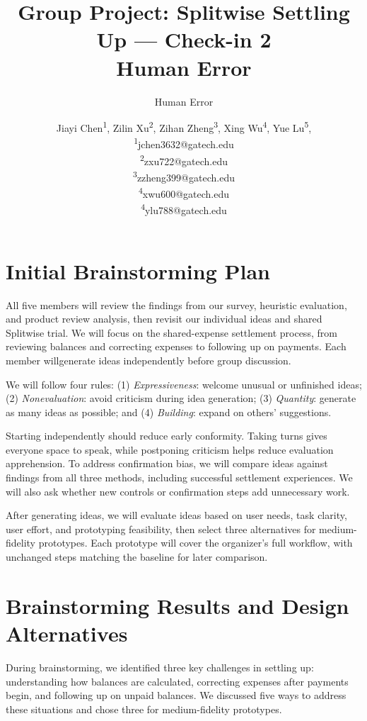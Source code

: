 \documentclass[letterpaper]{jdf}
\author{Human Error}
\title{Group Project: Splitwise Settling Up --- Check-in 2\\Human Error}
\author{
Jiayi Chen\textsuperscript{1},
Zilin Xu\textsuperscript{2},
Zihan Zheng\textsuperscript{3},
Xing Wu\textsuperscript{4},
Yue Lu\textsuperscript{5},
\\
\small
\textsuperscript{1}jchen3632@gatech.edu\\
\textsuperscript{2}zxu722@gatech.edu\\
\textsuperscript{3}zzheng399@gatech.edu\\
\textsuperscript{4}xwu600@gatech.edu\\
\textsuperscript{4}ylu788@gatech.edu
}
\begin{document}
\maketitle
\section{Initial Brainstorming Plan}

All five members will review the findings from our survey, heuristic evaluation, and product review analysis, then revisit our individual ideas and shared Splitwise trial. We will focus on the shared-expense settlement process, from reviewing balances and correcting expenses to following up on payments. Each member willgenerate ideas independently before group discussion.

We will follow four rules:
(1) \textit{Expressiveness}: welcome unusual or unfinished ideas;
(2) \textit{Nonevaluation}: avoid criticism during idea generation;
(3) \textit{Quantity}: generate as many ideas as possible; and
(4) \textit{Building}: expand on others' suggestions.

Starting independently should reduce early conformity. Taking turns gives everyone space to speak, while postponing criticism helps reduce evaluation apprehension. To address confirmation bias, we will compare ideas against findings from all three methods, including successful settlement experiences. We will also ask whether new controls or confirmation steps add unnecessary work.

After generating ideas, we will evaluate ideas based on user needs, task clarity, user effort, and prototyping feasibility, then select three alternatives for medium-fidelity prototypes. Each prototype will cover the organizer's full workflow, with unchanged steps matching the baseline for later comparison.

\section{Brainstorming Results and Design Alternatives}

During brainstorming, we identified three key challenges in settling up: understanding how balances are calculated, correcting expenses after payments begin, and following up on unpaid balances. We discussed five ways to address these situations and chose three for medium-fidelity prototypes.
\end{document}
